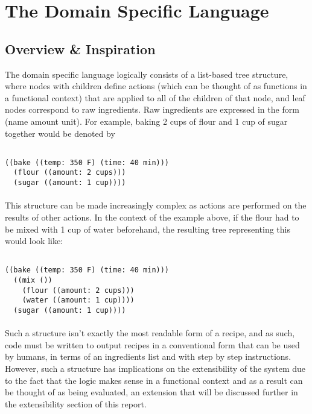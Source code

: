 \newpage
\section{The Domain Specific Language}
\subsection{Overview \& Inspiration}
The domain specific language logically consists of a list-based tree structure, where nodes with children define actions (which can be thought of as functions in a functional context) that are applied to all of the children of that node, and leaf nodes correspond to raw ingredients. Raw ingredients are expressed in the form (name amount unit). For example, baking 2 cups of flour and 1 cup of sugar together would be denoted by

\begin{verbatim}

((bake ((temp: 350 F) (time: 40 min)))
  (flour ((amount: 2 cups)))
  (sugar ((amount: 1 cup))))
\end{verbatim}

\paragraph{}
This structure can be made increasingly complex as actions are performed on the results of other actions. In the context of the example above, if the flour had to be mixed with 1 cup of water beforehand, the resulting tree representing this would look like:

\begin{verbatim}

((bake ((temp: 350 F) (time: 40 min)))
  ((mix ())
    (flour ((amount: 2 cups)))
    (water ((amount: 1 cup))))
  (sugar ((amount: 1 cup))))
\end{verbatim}
\paragraph{}
Such a structure isn't exactly the most readable form of a recipe, and as such, code must be written to output recipes in a conventional form that can be used by humans, in terms of an ingredients list and with step by step instructions. However, such a structure has implications on the extensibility of the system due to the fact that the logic makes sense in a functional context and as a result can be thought of as being evaluated, an extension that will be discussed further in the extensibility section of this report.


